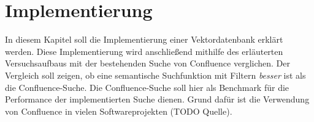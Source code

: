 \chapter{Implementierung}

In diesem Kapitel soll die Implementierung einer Vektordatenbank erklärt werden.
Diese Implementierung wird anschließend mithilfe des erläuterten Versuchsaufbaus mit der bestehenden Suche von Confluence verglichen.
Der Vergleich soll zeigen, ob eine semantische Suchfunktion mit Filtern \textit{besser} ist als die Confluence-Suche.
Die Confluence-Suche soll hier als Benchmark für die Performance der implementierten Suche dienen.
Grund dafür ist die Verwendung von Confluence in vielen Softwareprojekten (TODO Quelle).\\


